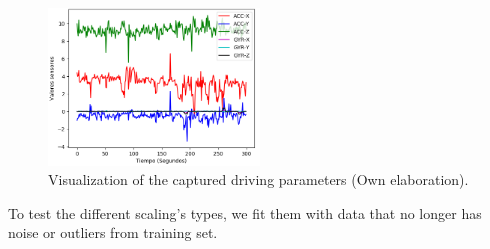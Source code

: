 \begin{figure}[h!]
  \begin{center}	\includegraphics[width=0.5\textwidth,frame]{imagenes/Cap3/datos_sin_preprocesamiento}
  \caption{Visualization of the captured driving parameters (Own elaboration).}
  \label{fig:datos_puros}
  \end{center}
\end{figure}

\vspace{5mm} %

To test the different scaling's types, we fit them with data that no longer has noise or outliers from training set.

